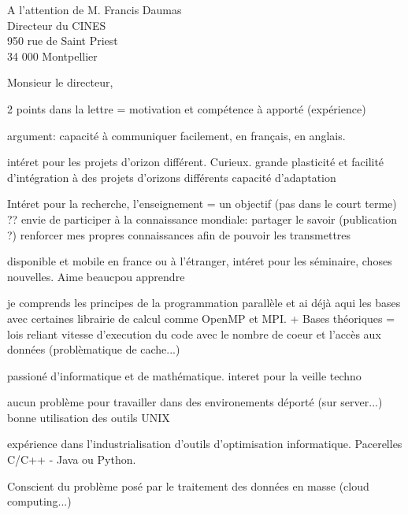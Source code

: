 \documentclass[12pt]{lettre}
\begin{document}
\begin{letter}{A l'attention de M. Francis Daumas\\Directeur du CINES\\950 rue de Saint Priest\\34 000 Montpellier}
\address{Victor Cameo Ponz\\16 rue Peyras\\31000 Toulouse}
\nofax

\opening{Monsieur le directeur,}
2 points dans la lettre = motivation et compétence à apporté (expérience)

argument:
capacité à communiquer facilement, en français, en anglais.

intéret pour les projets d'orizon différent. Curieux.
grande plasticité et facilité d'intégration à des projets d'orizons différents
capacité d'adaptation

Intéret pour la recherche, l'enseignement = un objectif (pas dans le court terme) ?? envie de participer à la connaissance mondiale: partager le savoir (publication ?) renforcer mes propres connaissances afin de pouvoir les transmettres

disponible et mobile en france ou à l'étranger, intéret pour les séminaire, choses nouvelles. Aime beaucpou apprendre

je comprends les principes de la programmation parallèle et ai déjà aqui les bases avec certaines librairie de calcul comme OpenMP et MPI. + Bases théoriques = lois reliant vitesse d'execution du code avec le nombre de coeur et l'accès aux données (problèmatique de cache...)

passioné d'informatique et de mathématique. interet pour la veille techno

aucun problème pour travailler dans des environements déporté (sur server...) bonne utilisation des outils UNIX

expérience dans l'industrialisation d'outils d'optimisation informatique. Pacerelles C/C++ - Java ou Python.

Conscient du problème posé par le traitement des données en masse (cloud computing...)


\end{letter}
\end{document}
